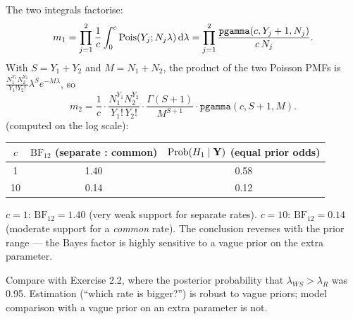 \documentclass[11pt]{article}
\begin{document}
\solution
{}
The two integrals factorise:
\[
m_1=\prod_{j=1}^2\frac1c\int_0^c\mathrm{Pois}(Y_j;N_j\lambda)\,\mathrm{d}\lambda=\prod_{j=1}^2\frac{\texttt{pgamma}(c,Y_j+1,N_j)}{c\,N_j}.
\]
With $S=Y_1+Y_2$ and $M=N_1+N_2$, the product of the two Poisson PMFs is $\frac{N_1^{Y_1}N_2^{Y_2}}{Y_1!Y_2!}\lambda^Se^{-M\lambda}$, so
\[
m_2=\frac1c\cdot\frac{N_1^{Y_1}N_2^{Y_2}}{Y_1!\,Y_2!}\cdot\frac{\Gamma(S+1)}{M^{S+1}}\cdot\texttt{pgamma}(c,S+1,M).
\]
 (computed on the log scale):
\begin{center}
\begin{tabular}{ccc}\toprule
$c$ & $\text{BF}_{12}$ (separate : common) & $\mathrm{Prob}(H_1\mid\mathbf Y)$ (equal prior odds)\\\midrule
1 & 1.40 & 0.58\\
10 & 0.14 & 0.12\\\bottomrule
\end{tabular}
\end{center}

\begin{answer}
$c=1$: $\text{BF}_{12}=1.40$ (very weak support for separate rates). $c=10$: $\text{BF}_{12}=0.14$ (moderate support for a \emph{common} rate). The conclusion reverses with the prior range --- the Bayes factor is highly sensitive to a vague prior on the extra parameter.
\end{answer}

\begin{takeaway}
Compare with Exercise 2.2, where the posterior probability that $\lambda_{WS}>\lambda_R$ was 0.95. Estimation (``which rate is bigger?'') is robust to vague priors; model comparison with a vague prior on an extra parameter is not.
\end{takeaway}

\end{document}
